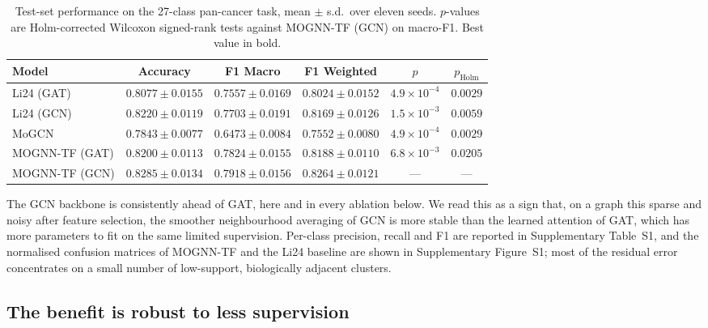 \documentclass[review,3p,times,11pt, ]{elsarticle} %
\begin{document}
\begin{table}[!t]
\centering
\caption{Test-set performance on the 27-class pan-cancer task, mean
$\pm$ s.d.\ over eleven seeds. $p$-values are Holm-corrected Wilcoxon
signed-rank tests against MOGNN-TF (GCN) on macro-F1. Best value in
bold.}
\label{tab:model_comparison}
\begin{adjustbox}{max width=\linewidth}
\begin{tabular}{lccccc}
\toprule
\textbf{Model} & \textbf{Accuracy} & \textbf{F1 Macro} & \textbf{F1 Weighted} & \textbf{$p$} & \textbf{$p_{\text{Holm}}$} \\
\midrule
Li24 (GAT)~\cite{li_multimodal_2024} & $0.8077 \pm 0.0155$ & $0.7557 \pm 0.0169$ & $0.8024 \pm 0.0152$ & $4.9\times10^{-4}$ & $0.0029$ \\
Li24 (GCN)~\cite{li_multimodal_2024} & $0.8220 \pm 0.0119$ & $0.7703 \pm 0.0191$ & $0.8169 \pm 0.0126$ & $1.5\times10^{-3}$ & $0.0059$ \\
MoGCN~\cite{li_mogcn_2022}           & $0.7843 \pm 0.0077$ & $0.6473 \pm 0.0084$ & $0.7552 \pm 0.0080$ & $4.9\times10^{-4}$ & $0.0029$ \\
MOGNN-TF (GAT)                       & $0.8200 \pm 0.0113$ & $0.7824 \pm 0.0155$ & $0.8188 \pm 0.0110$ & $6.8\times10^{-3}$ & $0.0205$ \\
MOGNN-TF (GCN)                       & $\mathbf{0.8285 \pm 0.0134}$ & $\mathbf{0.7918 \pm 0.0156}$ & $\mathbf{0.8264 \pm 0.0121}$ & --- & --- \\
\bottomrule
\end{tabular}
\end{adjustbox}
\end{table}

The GCN backbone is consistently ahead of GAT, here and in every
ablation below. We read this as a sign that, on a graph this sparse and
noisy after feature selection, the smoother neighbourhood averaging of
GCN is more stable than the learned attention of GAT, which has more
parameters to fit on the same limited supervision. Per-class precision,
recall and F1 are reported in Supplementary
Table~S1, and the normalised confusion matrices of MOGNN-TF and the
Li24 baseline are shown in Supplementary Figure~S1; most of the
residual error concentrates on a small number of low-support,
biologically adjacent clusters.

\subsection{The benefit is robust to less supervision}
\label{ssec:res_split}
\end{document}
